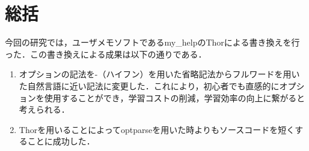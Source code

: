 \chapter{総括}\label{ux7dcfux62ec}

今回の研究では，ユーザメモソフトであるmy\_helpのThorによる書き換えを行った．この書き換えによる成果は以下の通りである．

\begin{enumerate}
\def\labelenumi{\arabic{enumi}.}
\item
  オプションの記法を-（ハイフン）を用いた省略記法からフルワードを用いた自然言語に近い記法に変更した．これにより，初心者でも直感的にオプションを使用することができ，学習コストの削減，学習効率の向上に繋がると考えられる．
\item
  Thorを用いることによってoptparseを用いた時よりもソースコードを短くすることに成功した．
\end{enumerate}

    